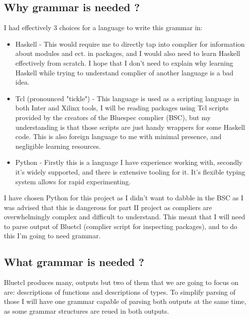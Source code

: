 \documentclass[14pt]{report}
\begin{document}
\subsection{Why grammar is needed ?}
I had effectively 3 choices for a language to write this grammar in:
\begin{itemize}
    \item Haskell - This would require me to directly tap into complier for information about modules and ect. in packages, and I would also need to learn Haskell effectively from scratch. I hope that I don't need to explain why learning Haskell while trying to understand complier of another language is a bad idea.
    \item Tcl (pronounced "tickle") - This language is used as a scripting language in both Inter and Xilinx tools, I will be reading packages using Tcl scripts provided by the creators of the Bluespec complier (BSC), but my understanding is that those scripts are just handy wrappers for some Haskell code. This is also foreign language to me with minimal presence, and negligible learning resources.
    \item Python - Firstly this is a language I have experience working with, secondly it's widely supported, and there is extensive tooling for it. It's flexible typing system allows for rapid experimenting. 
\end{itemize}
I have chosen Python for this project as I didn't want to dabble in the BSC as I was advised that this is dangerous for part II project as compliers are overwhelmingly complex and difficult to understand. This meant that I will need to parse output of Bluetcl (complier script for inspecting packages), and to do this I'm going to need grammar.

\subsection{What grammar is needed ?}
Bluetcl produces many, outputs but two of them that we are going to focus on are: descriptions of functions and descriptions of types. To simplify parsing of those I will have one grammar capable of parsing both outputs at the same time, as some grammar structures are reued in both outputs.
\end{document}
